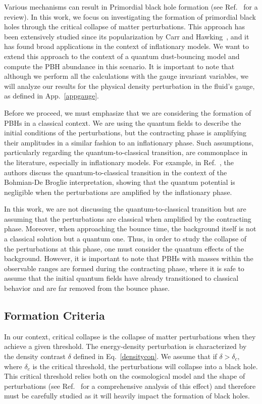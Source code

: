 \documentclass[a4paper,11pt]{article}
\begin{document}
Various mechanisms can result in Primordial black hole formation (see
Ref.~\cite{Escriva2023} for a review). In this work, we focus on investigating the
formation of primordial black holes through the critical collapse of matter
perturbations. This approach has been extensively studied since its popularization by
Carr and Hawking~\cite{Hawking1971, Carr1974}, and it has found broad applications in
the context of inflationary models. We want to extend this approach to the context of a
quantum dust-bouncing model and compute the PBH abundance in this scenario. It is
important to note that although we perform all the calculations with the gauge invariant
variables, we will analyze our results for the physical density perturbation in the
fluid's gauge, as defined in App.~\ref{appgauge}.

{\color{red} Before we proceed, we must emphasize that we are considering the formation
of PBHs in a classical context. We are using the quantum fields to describe the initial
conditions of the perturbations, but the contracting phase is amplifying their
amplitudes in a similar fashion to an inflationary phase. Such assumptions, particularly
regarding the quantum-to-classical transition, are commonplace in the literature,
especially in inflationary models. For example, in Ref.~\cite{Q2C2}, the authors discuss
the quantum-to-classical transition in the context of the Bohmian-De Broglie
interpretation, showing that the quantum potential is negligible when the perturbations
are amplified by the inflationary phase.

In this work, we are not discussing the quantum-to-classical transition but are assuming
that the perturbations are classical when amplified by the contracting phase. Moreover,
when approaching the bounce time, the background itself is not a classical solution but
a quantum one. Thus, in order to study the collapse of the perturbations at this phase,
one must consider the quantum effects of the background. However, it is important to
note that PBHs with masses within the observable ranges are formed during the
contracting phase, where it is safe to assume that the initial quantum fields have
already transitioned to classical behavior and are far removed from the bounce phase.}

\subsection{Formation Criteria}

In our context, critical collapse is the collapse of matter perturbations when they
achieve a given threshold. The energy-density perturbation is characterized by the
density contrast $\delta$ defined in Eq.~\eqref{densitycon}. We assume that if $\delta >
	\delta_c$, where $\delta_c$ is the critical threshold, the perturbations will collapse
into a black hole. This critical threshold relies both on the cosmological model and the
shape of perturbations (see Ref.~\cite{Niemeyer1998, Musco2019} for a comprehensive
analysis of this effect) and therefore must be carefully studied as it will heavily
impact the formation of black holes.
\end{document}
